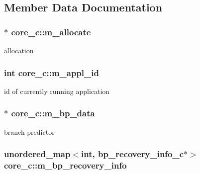 \subsection{Member Data Documentation}
\hypertarget{classcore__c_ae1269af11357d7b3e65eadce74086b27}{
\subsubsection[{m\_\-allocate}]{$\ast$ {\bf core\_\-c::m\_\-allocate}}}
\label{classcore__c_ae1269af11357d7b3e65eadce74086b27}
allocation \hypertarget{classcore__c_a957210a01132d2371fdff5eb64daca0f}{
\subsubsection[{m\_\-appl\_\-id}]{\setlength{\rightskip}{0pt plus 5cm}int {\bf core\_\-c::m\_\-appl\_\-id}}}
\label{classcore__c_a957210a01132d2371fdff5eb64daca0f}
id of currently running application \hypertarget{classcore__c_ab8e8bae41d47d3bfbd25980b70e613f7}{
\subsubsection[{m\_\-bp\_\-data}]{$\ast$ {\bf core\_\-c::m\_\-bp\_\-data}}}
\label{classcore__c_ab8e8bae41d47d3bfbd25980b70e613f7}
branch predictor \hypertarget{classcore__c_a6f33ae7ae833c7c78596c4461cd39684}{
\subsubsection[{m\_\-bp\_\-recovery\_\-info}]{\setlength{\rightskip}{0pt plus 5cm}unordered\_\-map$<$int, {\bf bp\_\-recovery\_\-info\_\-c}$\ast$$>$ {\bf core\_\-c::m\_\-bp\_\-recovery\_\-info}}}
